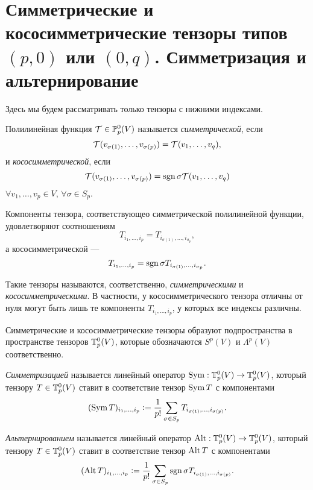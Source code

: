 \section{Симметрические и кососимметрические тензоры типов $(p, 0)$ или $(0, q)$. Симметризация и альтернирование}

Здесь мы будем рассматривать только тензоры с нижними индексами.

\begin{definition}
    Полилинейная функция $\mathcal{T} \in \mathbb{P}_p^0(V)$ называется \textit{симметрической}, если
    \[
        \mathcal{T}(v_{\sigma(1)}, \ldots, v_{\sigma(p)}) = \mathcal{T}(v_1, \ldots, v_q),
    \]
    и \textit{кососимметрической}, если
    \[
        \mathcal{T}(v_{\sigma(1)}, \ldots, v_{\sigma(p)}) = \operatorname{sgn}\sigma\mathcal{T}(v_1, \ldots, v_q)
    \]
    $\forall v_1, \ldots, v_p \in V$, $\forall \sigma \in S_p$.
\end{definition}

Компоненты тензора, соответствующео симметрической полилинейной функции, удовлетворяют соотношениям
\[
    T_{i_1, \ldots, i_p} = T_{i_{\sigma(1)}, \ldots, i_{\sigma_p}},
\]
а кососимметрической ---
\[
    T_{i_1, \ldots, i_p} = \operatorname{sgn}\sigma T_{i_{\sigma(1)}, \ldots, i_{\sigma_p}}.
\]

Такие тензоры называются, соответственно, \textit{симметрическими} и \textit{кососимметрическими}. В частности, у кососимметрического тензора отличны от нуля могут быть лишь те компоненты $T_{i_1, \ldots, i_p}$, у которых все индексы различны.

Симметрические и кососимметрические тензоры образуют подпространства в пространстве тензоров $\mathbb{T}_p^0(V)$, которые обозначаются $S^p(V)$ и $\Lambda^p(V)$ соответственно.

\begin{definition}
    \textit{Симметризацией} называется линейный оператор $\operatorname{Sym}: \mathbb{T}_p^0(V) \to \mathbb{T}_p^0(V)$, который тензору $T \in \mathbb{T}_p^0(V)$ ставит в соответствие тензор $\operatorname{Sym} T$ с компонентами
    \[
        (\operatorname{Sym} T)_{i_1, \ldots, i_p} \vcentcolon = \frac{1}{p!}\sum_{\sigma \in S_p}T_{i_{\sigma(1)}, \ldots, i_{\sigma(p)}}.
    \]
\end{definition}

\begin{definition}
    \textit{Альтернированием} называется линейный оператор $\operatorname{Alt}: \mathbb{T}_p^0(V) \to \mathbb{T}_p^0(V)$, который тензору $T \in \mathbb{T}_p^0(V)$ ставит в соответствие тензор $\operatorname{Alt} T$ с компонентами
    \[
        (\operatorname{Alt} T)_{i_1, \ldots, i_p} \vcentcolon = \frac{1}{p!}\sum_{\sigma \in S_p}\operatorname{sgn}\sigma T_{i_{\sigma(1)}, \ldots, i_{\sigma(p)}}.
    \]
\end{definition}

